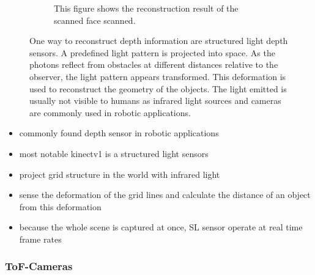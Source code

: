 \begin{figure}[H]
\begin{subfigure}[t]{0.45\textwidth}
        \caption{This figure shows the reconstruction result of the scanned face scanned\cite{sl_depthsensor_calibration}.}
    \end{subfigure}
    \caption[Visible light pattern used for structured-light depth sensors]{One way to reconstruct depth information are structured light depth sensors. A predefined light pattern is projected into space. As the photons reflect from obstacles at different distances relative to the observer, the light pattern appears transformed. This deformation is used to reconstruct the geometry of the objects. The light emitted is usually not visible to humans as infrared light sources and cameras are commonly used in robotic applications.\label{fig:sl_face}}
\end{figure}

\begin{itemize}
    \item commonly found depth sensor in robotic applications
    \item most notable kinectv1 is a structured light sensors
    \item project grid structure in the world with infrared light
    \item sense the deformation of the grid lines and calculate the distance of an object from this deformation
    \item because the whole scene is captured at once, SL sensor operate at real time frame rates
\end{itemize}

\subsubsection{\acrlong{ToF}-Cameras}

